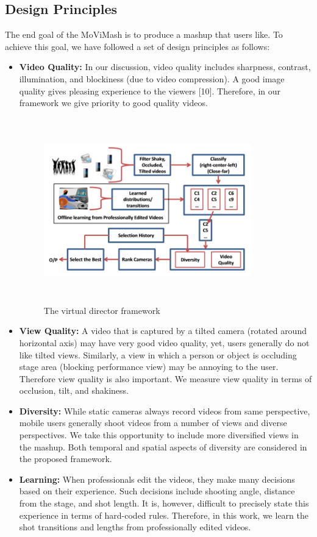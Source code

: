 \documentclass{clsfile}
\begin{document}
\subsection{Design Principles}
The end goal of the MoViMash is to produce a mashup that users
like. To achieve this goal, we have followed a set of design principles
as follows:
\begin{itemize}
    \item \textbf{Video Quality:} In our discussion, video quality includes
sharpness, contrast, illumination, and blockiness (due to video
compression). A good image quality gives pleasing experience
to the viewers [10]. Therefore, in our framework we
give priority to good quality videos.
\begin{figure}
\includegraphics[width=9cm, height=8cm]{fig2.png}
   \caption{  The virtual director framework}
\end{figure}
\item \textbf{View Quality:} A video that is captured by a tilted camera
(rotated around horizontal axis) may have very good video
quality, yet, users generally do not like tilted views. Similarly,
a view in which a person or object is occluding stage
area (blocking performance view) may be annoying to the user. Therefore view quality is also important. We measure
view quality in terms of occlusion, tilt, and shakiness.
\item \textbf{Diversity:} While static cameras always record videos from
same perspective, mobile users generally shoot videos from
a number of views and diverse perspectives. We take this
opportunity to include more diversified views in the mashup.
Both temporal and spatial aspects of diversity are considered
in the proposed framework.
\item \textbf{Learning:} When professionals edit the videos, they make
many decisions based on their experience. Such decisions
include shooting angle, distance from the stage, and shot
length. It is, however, difficult to precisely state this experience
in terms of hard-coded rules. Therefore, in this work,
we learn the shot transitions and lengths from professionally
edited videos.
\end{itemize}
\end{document}
